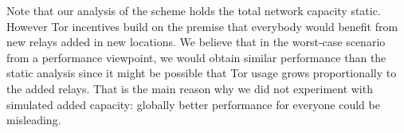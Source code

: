 
Note that our analysis of the scheme holds the total network capacity static.
However Tor incentives build on the premise that everybody would benefit from
new relays added in new locations. We believe that in the worst-case scenario
from a performance viewpoint, we would obtain similar performance than the
static analysis since it might be possible that Tor usage grows proportionally
to the added relays. That is the main reason why we did not experiment with
simulated added capacity: globally better performance for everyone could be
misleading.


